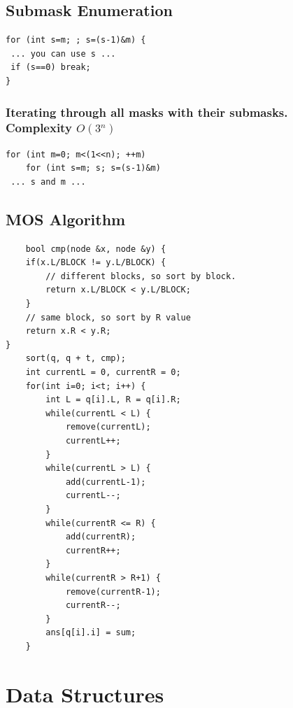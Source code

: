 \documentclass[8pt, a4paper, oneside, twocolumn]{extarticle}
\begin{document}
\subsection{Submask Enumeration}
\begin{verbatim}
for (int s=m; ; s=(s-1)&m) {
 ... you can use s ...
 if (s==0) break;
}
\end{verbatim}
\subsubsection{Iterating through all masks with their submasks. Complexity $O(3^n)$}
\begin{verbatim}
for (int m=0; m<(1<<n); ++m)
	for (int s=m; s; s=(s-1)&m)
 ... s and m ...
\end{verbatim}
\subsection{MOS Algorithm}
\begin{verbatim}
    bool cmp(node &x, node &y) {
    if(x.L/BLOCK != y.L/BLOCK) {
        // different blocks, so sort by block.
        return x.L/BLOCK < y.L/BLOCK;
    }
    // same block, so sort by R value
    return x.R < y.R;
}
    sort(q, q + t, cmp);
    int currentL = 0, currentR = 0;
    for(int i=0; i<t; i++) {
        int L = q[i].L, R = q[i].R;
        while(currentL < L) {
            remove(currentL);
            currentL++;
        }
        while(currentL > L) {
            add(currentL-1);
            currentL--;
        }
        while(currentR <= R) {
            add(currentR);
            currentR++;
        }
        while(currentR > R+1) {
            remove(currentR-1);
            currentR--;
        }
        ans[q[i].i] = sum;
    }
\end{verbatim}
\section{Data Structures}
\end{document}
